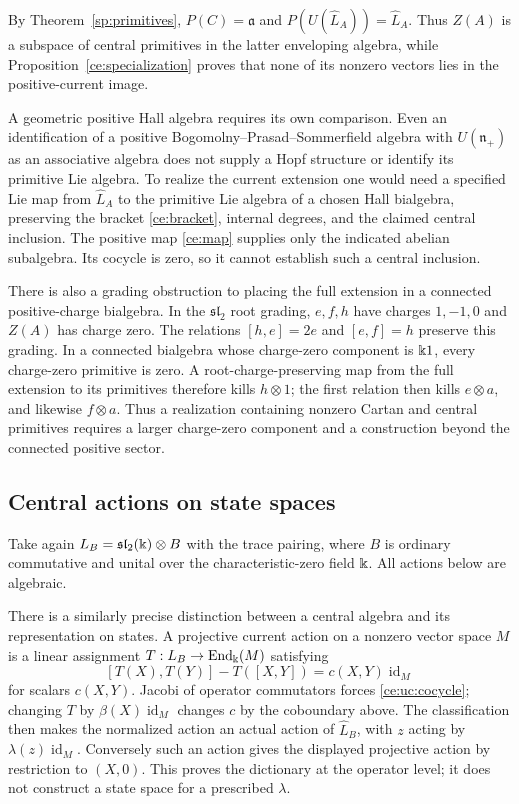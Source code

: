 By Theorem~\ref{sp:primitives}, $P(C)=\mathfrak a$ and
$P(U(\widehat L_A))=\widehat L_A$. Thus $Z(A)$ is a subspace of
central primitives in the latter enveloping algebra, while
Proposition~\ref{ce:specialization} proves that none of its nonzero
vectors lies in the positive-current image.

A geometric positive Hall algebra requires its own comparison.  Even
an identification of a positive Bogomolny--Prasad--Sommerfield algebra with $U(\mathfrak n_+)$ as
an associative algebra does not supply a Hopf structure or identify its
primitive Lie algebra.  To realize the current extension one would need
a specified Lie map from $\widehat L_A$ to the primitive Lie algebra of
a chosen Hall bialgebra, preserving the bracket
\eqref{ce:bracket}, internal degrees, and the claimed central inclusion.
The positive map \eqref{ce:map} supplies only the indicated abelian
subalgebra.  Its cocycle is zero, so it cannot establish such a central
inclusion.

There is also a grading obstruction to placing the full extension in a
connected positive-charge bialgebra.  In the $\mathfrak{sl}_2$ root
grading, $e,f,h$ have charges $1,-1,0$ and $Z(A)$ has charge zero.
The relations $[h,e]=2e$ and $[e,f]=h$ preserve this grading.  In a
connected bialgebra whose charge-zero component is $\Bbbk1$, every
charge-zero primitive is zero.  A root-charge-preserving map from the
full extension to its primitives therefore kills $h\otimes1$; the first
relation then kills $e\otimes a$, and likewise $f\otimes a$.
Thus a realization containing nonzero Cartan and central primitives
requires a larger charge-zero component and a construction beyond the
connected positive sector.

\subsection{Central actions on state spaces}

Take again $L_B=\mathfrak{sl}_2(\Bbbk)\otimes B$ with the trace pairing,
where $B$ is ordinary commutative and unital over the characteristic-zero
field $\Bbbk$.  All actions below are algebraic.

There is a similarly precise distinction between a central algebra and
its representation on states.  A projective current action on a
nonzero vector space $M$ is a linear assignment
$T:L_B\to\operatorname{End}_\Bbbk(M)$ satisfying
\[
 [T(X),T(Y)]-T([X,Y])=c(X,Y)\operatorname{id}_M
\]
for scalars $c(X,Y)$.  Jacobi of operator commutators forces
\eqref{ce:uc:cocycle}; changing $T$ by $\beta(X)\operatorname{id}_M$
changes $c$ by the coboundary above.  The classification then makes
the normalized action an actual action of $\widehat L_B$, with $z$
acting by $\lambda(z)\operatorname{id}_M$.
Conversely such an action gives the displayed projective action by
restriction to $(X,0)$.  This proves the dictionary at the operator
level; it does not construct a state space for a prescribed $\lambda$.

